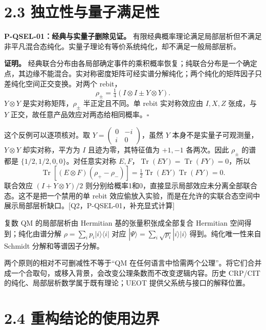 \documentclass[
  11pt,
  oneside]{book}
\begin{document}
\hypertarget{ux72ecux7acbux6027ux4e0eux91cfux5b50ux6ee1ux8db3ux6027}{%
\section{2.3
独立性与量子满足性}\label{ux72ecux7acbux6027ux4e0eux91cfux5b50ux6ee1ux8db3ux6027}}

\protect\hypertarget{p-qsel-01}{}{}

\textbf{P-QSEL-01：经典与实量子删除见证。}
有限经典概率理论满足局部层析但不满足非平凡混合态纯化。实量子理论有等价系统纯化，却不满足一般局部层析。

\textbf{证明。}
经典联合分布由各局部确定事件的乘积概率恢复；纯联合分布是一个确定点，其边缘不能混合。实对称密度矩阵可经实谱分解纯化；两个纯化的矩阵因子只差纯化空间正交变换。对两个
rebit， \[
\rho_\pm=\tfrac14(I\otimes I\pm Y\otimes Y).
\] \(Y\otimes Y\) 是实对称矩阵，\(\rho_\pm\) 半正定且不同。单 rebit
实对称效应由 \(I,X,Z\) 张成，与 \(Y\)
正交，故任意产品效应对两态给相同概率。\(\square\)

这个反例可以逐项核对。取
\(Y=\left(\begin{smallmatrix}0&-i\\i&0\end{smallmatrix}\right)\)，虽然
\(Y\) 本身不是实量子可观测量，\(Y\otimes Y\) 却实对称，平方为 \(I\)
且迹为零，其特征值为 \(+1,-1\) 各两次。因此 \(\rho_\pm\) 的谱都是
\(\{1/2,1/2,0,0\}\)。对任意实对称
\(E,F\)，\(\operatorname{Tr}(EY)=\operatorname{Tr}(FY)=0\)，所以 \[
\operatorname{Tr}[(E\otimes F)(\rho_+-\rho_-)]=
\tfrac12\operatorname{Tr}(EY)\operatorname{Tr}(FY)=0.
\] 联合效应 \((I+Y\otimes Y)/2\)
则分别给概率1和0，直接显示局部效应未分离全部联合态。这不是把一个禁用的单
rebit
效应偷放入实验，而是在允许的实联合态空间中展示局部层析缺口。{[}Q2，P-QSEL-01，补充显式计算{]}

复数 QM 的局部层析由 Hermitian 基的张量积张成全部复合 Hermitian
空间得到；纯化由谱分解 \(\rho=\sum_i p_i|i\rangle\langle i|\) 对应
\(|\Psi\rangle=\sum_i\sqrt{p_i}|i\rangle|i\rangle\) 得到。纯化唯一性来自
Schmidt 分解和等谱因子分解。

两个原则的相对不可删减性不等于``QM
在任何语言中恰需两个公理''。将它们合并成一个合取句，或移入背景，会改变公理条数而不改变逻辑内容。历史
CRP/CIT 的纯化、局部层析数学属于既有理论；UEOT
提供父系统与接口的解释位置。

\hypertarget{ux91cdux6784ux7ed3ux8bbaux7684ux4f7fux7528ux8fb9ux754c}{%
\section{2.4
重构结论的使用边界}\label{ux91cdux6784ux7ed3ux8bbaux7684ux4f7fux7528ux8fb9ux754c}}
\end{document}
